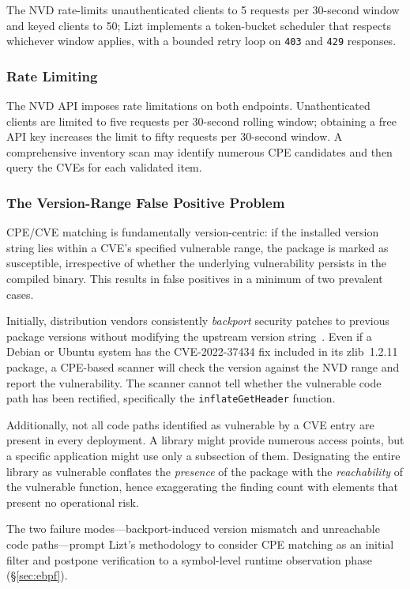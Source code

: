 \documentclass[conference]{IEEEtran}
\begin{document}
The NVD rate-limits unauthenticated clients to 5 requests per 30-second window and keyed clients to 50; Lizt implements a token-bucket scheduler that respects whichever window applies, with a bounded retry loop on \texttt{403} and \texttt{429} responses.

\subsubsection{Rate Limiting}

The NVD API imposes rate limitations on both endpoints. Unathenticated clients are limited to five requests per 30-second rolling window; obtaining a free API key increases the limit to fifty requests per 30-second window. A comprehensive inventory scan may identify numerous CPE candidates and then query the CVEs for each validated item.

\subsubsection{The Version-Range False Positive Problem}

CPE/CVE matching is fundamentally version-centric: if the installed version string lies within a CVE's specified vulnerable range, the package is marked as susceptible, irrespective of whether the underlying vulnerability persists in the compiled binary. This results in false positives in a minimum of two prevalent cases.

Initially, distribution vendors consistently \textit{backport} security patches to previous package versions without modifying the upstream version string~\cite{redhat_backporting}. Even if a Debian or Ubuntu system has the CVE-2022-37434 fix included in its zlib~1.2.11 package, a CPE-based scanner will check the version against the NVD range and report the vulnerability. The scanner cannot tell whether the vulnerable code path has been rectified, specifically the \texttt{inflateGetHeader} function.

Additionally, not all code paths identified as vulnerable by a CVE entry are present in every deployment. A library might provide numerous access points, but a specific application might use only a subsection of them. Designating the entire library as vulnerable conflates the \textit{presence} of the package with the \textit{reachability} of the vulnerable function, hence exaggerating the finding count with elements that present no operational risk.

The two failure modes---backport-induced version mismatch and unreachable code paths---prompt Lizt's methodology to consider CPE matching as an initial filter and postpone verification to a symbol-level runtime observation phase (\S\ref{sec:ebpf}).
\end{document}
